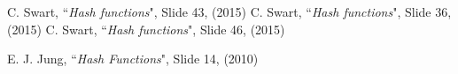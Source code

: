 \begin{thebibliography}{99}
    
C. Swart, ``{\it Hash functions}", Slide 43, (2015)
C. Swart, ``{\it Hash functions}", Slide 36, (2015)
C. Swart, ``{\it Hash functions}", Slide 46, (2015)

E. J. Jung, ``{\it Hash Functions}", Slide 14, (2010)
\end{thebibliography}
